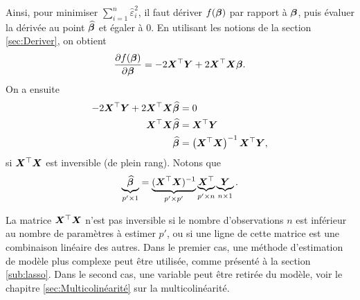 Ainsi, pour minimiser $\sum_{i=1} ^n{\widehat{\varepsilon}_i^2}$, il faut dériver $f(\bm\beta)$ par rapport à $\bm\beta$, puis évaluer la dérivée au point $\widehat{\bm\beta}$ et égaler à 0. En utilisant les notions de la section \ref{sec:Deriver}, on obtient
\[\frac{\partial f(\bm\beta)}{ \partial \bm\beta} = -2\bm{X}^\top \bm{Y} + 2\bm{X}^\top \bm{X} \bm\beta.\]
On a ensuite 
\begin{align}
    -2\bm{X}^\top \bm{Y} + 2\bm{X}^\top \bm{X} \widehat{\bm\beta} &= 0 \nonumber\\
    \bm{X}^\top \bm{X} \widehat{\bm\beta}  &= \bm{X}^\top \bm{Y} \nonumber\\
    \widehat{\bm\beta}  &= \left( \bm{X}^\top \bm{X} \right)^{-1}\bm{X}^\top \bm{Y} , \label{eq:est_beta}
\end{align}
si $\bm{X}^\top \bm{X}$ est inversible (de plein rang).
Notons que
\begin{eqnarray*}
	\underbrace{\widehat{\bm\beta}}_{p'\times 1}=\underbrace{(\bm{X}^\top \bm{X})^{-1}}_{p'\times p'} \underbrace{\bm{X}^\top}_{p'\times n} \underbrace{\bm{Y}}_{n\times 1}.
\end{eqnarray*}

\begin{remarque}
La matrice $\bm{X}^\top \bm{X}$ n'est pas  inversible si le nombre d'observations $n$ est inférieur au nombre de paramètres à estimer $p'$, ou si une ligne de cette matrice est une combinaison linéaire des autres. Dans le premier cas, une méthode d'estimation de modèle plus complexe peut être utilisée, comme présenté à la section \ref{sub:lasso}. Dans le second cas, une variable peut être retirée du modèle, voir le chapitre \ref{sec:Multicolinéarité} sur la multicolinéarité.
\end{remarque}

